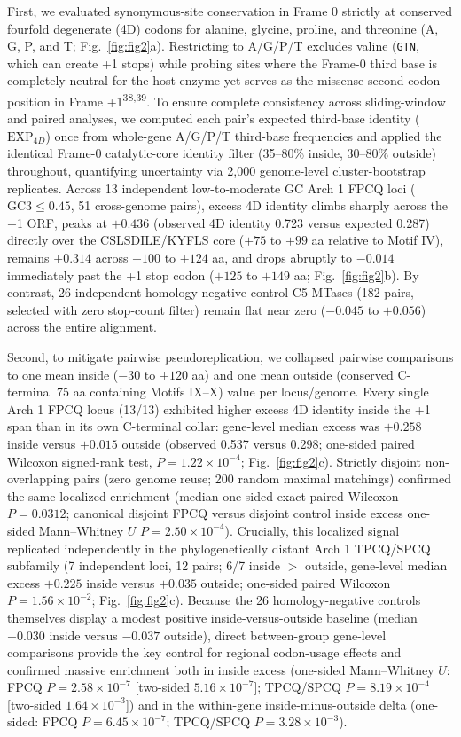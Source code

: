\documentclass[10pt,letterpaper]{article}
\newcommand{\refsup}[1]{\textsuperscript{#1}}
\begin{document}
First, we evaluated synonymous-site conservation in Frame 0 strictly at conserved fourfold degenerate (4D) codons for alanine, glycine, proline, and threonine (A, G, P, and T; Fig.~\ref{fig:fig2}a). Restricting to A/G/P/T excludes valine (\texttt{GTN}, which can create +1 stops) while probing sites where the Frame-0 third base is completely neutral for the host enzyme yet serves as the missense second codon position in Frame +1\refsup{38,39}. To ensure complete consistency across sliding-window and paired analyses, we computed each pair's expected third-base identity ($\text{EXP}_{4D}$) once from whole-gene A/G/P/T third-base frequencies and applied the identical Frame-0 catalytic-core identity filter (35--80\% inside, 30--80\% outside) throughout, quantifying uncertainty via 2,000 genome-level cluster-bootstrap replicates. Across 13 independent low-to-moderate GC Arch 1 FPCQ loci ($\text{GC3} \le 0.45$, 51 cross-genome pairs), excess 4D identity climbs sharply across the +1 ORF, peaks at $+0.436$ (observed 4D identity 0.723 versus expected 0.287) directly over the CSLSDILE/KYFLS core ($+75$ to $+99$ aa relative to Motif IV), remains $+0.314$ across $+100$ to $+124$ aa, and drops abruptly to $-0.014$ immediately past the +1 stop codon ($+125$ to $+149$ aa; Fig.~\ref{fig:fig2}b). By contrast, 26 independent homology-negative control C5-MTases (182 pairs, selected with zero stop-count filter) remain flat near zero ($-0.045$ to $+0.056$) across the entire alignment.

Second, to mitigate pairwise pseudoreplication, we collapsed pairwise comparisons to one mean inside ($-30$ to $+120$ aa) and one mean outside (conserved C-terminal 75 aa containing Motifs IX--X) value per locus/genome. Every single Arch 1 FPCQ locus (13/13) exhibited higher excess 4D identity inside the +1 span than in its own C-terminal collar: gene-level median excess was $+0.258$ inside versus $+0.015$ outside (observed 0.537 versus 0.298; one-sided paired Wilcoxon signed-rank test, $P = 1.22 \times 10^{-4}$; Fig.~\ref{fig:fig2}c). Strictly disjoint non-overlapping pairs (zero genome reuse; 200 random maximal matchings) confirmed the same localized enrichment (median one-sided exact paired Wilcoxon $P = 0.0312$; canonical disjoint FPCQ versus disjoint control inside excess one-sided Mann--Whitney $U$ $P = 2.50 \times 10^{-4}$). Crucially, this localized signal replicated independently in the phylogenetically distant Arch 1 TPCQ/SPCQ subfamily (7 independent loci, 12 pairs; 6/7 inside $>$ outside, gene-level median excess $+0.225$ inside versus $+0.035$ outside; one-sided paired Wilcoxon $P = 1.56 \times 10^{-2}$; Fig.~\ref{fig:fig2}c). Because the 26 homology-negative controls themselves display a modest positive inside-versus-outside baseline (median $+0.030$ inside versus $-0.037$ outside), direct between-group gene-level comparisons provide the key control for regional codon-usage effects and confirmed massive enrichment both in inside excess (one-sided Mann--Whitney $U$: FPCQ $P = 2.58 \times 10^{-7}$ [two-sided $5.16 \times 10^{-7}$]; TPCQ/SPCQ $P = 8.19 \times 10^{-4}$ [two-sided $1.64 \times 10^{-3}$]) and in the within-gene inside-minus-outside delta (one-sided: FPCQ $P = 6.45 \times 10^{-7}$; TPCQ/SPCQ $P = 3.28 \times 10^{-3}$).
\end{document}
